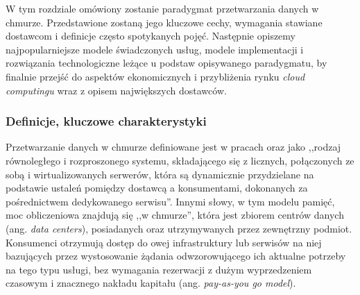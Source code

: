 \documentclass[12pt,a4paper,twoside]{article}
\begin{document}
\noindent
W tym rozdziale omówiony zostanie paradygmat przetwarzania danych w chmurze. Przedstawione zostaną jego kluczowe cechy, wymagania stawiane dostawcom i definicje często spotykanych pojęć. Następnie opiszemy najpopularniejsze modele świadczonych usług, modele implementacji i rozwiązania technologiczne leżące u podstaw opisywanego paradygmatu, by finalnie przejść do aspektów ekonomicznych i przybliżenia rynku \textit{cloud computingu} wraz z opisem największych dostawców.

\subsubsection{Definicje, kluczowe charakterystyki}

\noindent
Przetwarzanie danych w chmurze definiowane jest w pracach \citet{buyya2009} oraz \citet{calheiros2010} jako ,,rodzaj równoległego i rozproszonego systemu, składającego się z licznych, połączonych ze sobą i wirtualizowanych serwerów, która są dynamicznie przydzielane na podstawie ustaleń pomiędzy dostawcą a konsumentami, dokonanych za pośrednictwem dedykowanego serwisu''. Innymi słowy, w tym modelu pamięć, moc obliczeniowa znajdują się ,,w chmurze'', która jest zbiorem centrów danych (ang. \textit{data centers}), posiadanych oraz utrzymywanych przez zewnętrzny podmiot. Konsumenci otrzymują dostęp do owej infrastruktury lub serwisów na niej bazujących przez wystosowanie żądania odwzorowującego ich aktualne potrzeby na tego typu usługi, bez wymagania rezerwacji z dużym wyprzedzeniem czasowym i znacznego nakładu kapitału (ang. \textit{pay-as-you go model}).
\end{document}
